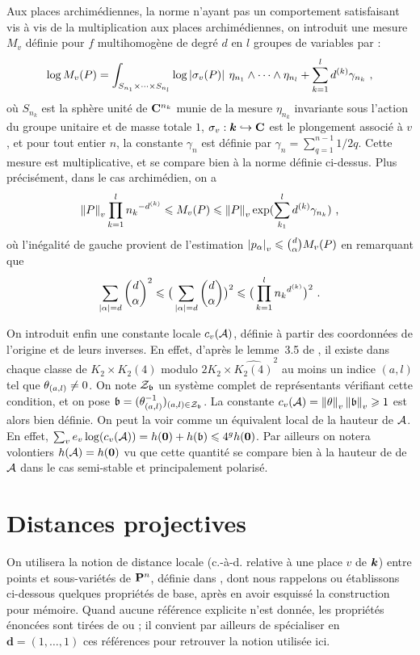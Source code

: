 \documentclass[11pt, twoside, a4paper]{article}
\theoremstyle{remark}
\begin{document}
Aux places archimédiennes, la norme n'ayant pas un comportement satisfaisant vis à vis de la multiplication aux places archimédiennes, on introduit une mesure $M_v$ définie pour $f$ multihomogène de degré $d$ en $l$ groupes de variables par :
\[
 \log \mv P = \int_{S_{n_1} \times \cdots \times S_{n_l}} \log \av[]{\sigma_v(P)} \, \eta_{n_1}\wedge\cdots\wedge \eta_{n_l} + \sum_{k=1}^l d^{(k)} \gamma_{n_k} \pmm,
\]
où $S_{n_k}$ est la sphère unité de $\C^{n_k}$ munie de la mesure $\eta_{n_k}$ invariante sous l'action du groupe unitaire et de masse totale $1$, $\sigma_v : \cdn \hookrightarrow \C$ est le plongement associé à $v$, et pour tout entier $n$, la constante $\gamma_n$ est définie par $\gamma_n = \sum_{q=1}^{n-1} 1/2q$. Cette mesure est multiplicative, et se compare bien à la norme définie ci-dessus. Plus précisément, dans le cas archimédien, on a
\[
 \nv P  \prod_{k=1}^l {n_k}^{-d^{(k)}}
 \le \mv P
 \le \nv P \exp(\sum_{k_1}^l d^{(k)} \gamma_{n_k}) \pmm,
\]
où l'inégalité de gauche provient de l'estimation $\av{p_\alpha} \le \binom{d}{\alpha} \mv P$ \cite[dém. du lemme~3.3]{rem1} en remarquant que
\[
 \sum_{\vlg\alpha = d} \binom{d}{\alpha}^2 \le \big(\sum_{\vlg\alpha = d} \binom{d}{\alpha}\big)^2 \le \big(\prod_{k=1}^l {n_k}^{d^{(k)}}\big)^2 \pmm.
\]

On introduit enfin une constante locale $c_v(\A)$, définie à partir des coordonnées de l'origine et de leurs inverses. En effet, d'après le lemme~3.5 de \cite{daphi}, il existe dans chaque classe de $K_2 \times \widehat{K_2(4)}$ modulo $2K_2 \times \widehat{K_2(4)}^2$ au moins un indice $(a, l)$ tel que $\coa_{(a,l)} \neq 0$. On note $\mathcal{Z}_\BA$ un système complet de représentants vérifiant cette condition, et on pose $\BA = (\coa_{(a, l)}^{-1})_{(a, l) \in \mathcal{Z}_\BA}$. La constante $c_v(\A) = \nv{\coa}\nv{\BA} \ge 1$ est alors bien définie. On peut la voir comme un équivalent local de la hauteur de $\A$. En effet, $\sum_v e_v \log (c_v(\A)) = h(\OA) + h(\BA) \le 4^g h(\OA)$. Par ailleurs on notera volontiers $h(\A) = h(\OA)$ vu que cette quantité se compare bien à la hauteur de  de $\A$ dans le cas semi-stable et principalement polarisé.

	\section{Distances projectives}

On utilisera la notion de distance locale (c.-à-d. relative à une place $v$ de $\cdn$) entre points et sous-variétés de $\Proj^n$, définie dans \cite{phi1}, dont nous rappelons ou établissons ci-dessous quelques propriétés de base, après en avoir esquissé la construction pour mémoire. Quand aucune référence explicite n'est donnée, les propriétés énoncées sont tirées de \cite{phi1} ou \cite{rem1} ; il convient par ailleurs de spécialiser en $\mathbf{d} = (1, \dots, 1)$ ces références pour retrouver la notion utilisée ici.
\end{document}
